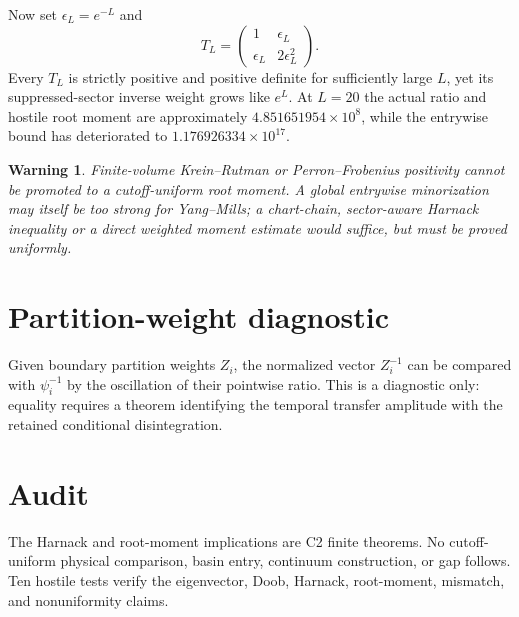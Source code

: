 \documentclass[11pt]{article}
\newtheorem{warning}{Warning}
\begin{document}
Now set $\epsilon_L=e^{-L}$ and
\[
 T_L=\begin{pmatrix}1&\epsilon_L\\
 \epsilon_L&2\epsilon_L^2\end{pmatrix}.
\]
Every $T_L$ is strictly positive and positive definite for sufficiently large
$L$, yet its suppressed-sector inverse weight grows like $e^L$.  At $L=20$
the actual ratio and hostile root moment are approximately
$4.851651954\times10^8$, while the entrywise bound has deteriorated to
$1.176926334\times10^{17}$.

\begin{warning}
Finite-volume Krein--Rutman or Perron--Frobenius positivity cannot be promoted
to a cutoff-uniform root moment.  A global entrywise minorization may itself be
too strong for Yang--Mills; a chart-chain, sector-aware Harnack inequality or a
direct weighted moment estimate would suffice, but must be proved uniformly.
\end{warning}

\section{Partition-weight diagnostic}
Given boundary partition weights $Z_i$, the normalized vector $Z_i^{-1}$ can
be compared with $\psi_i^{-1}$ by the oscillation of their pointwise ratio.
This is a diagnostic only: equality requires a theorem identifying the
temporal transfer amplitude with the retained conditional disintegration.

\section{Audit}
The Harnack and root-moment implications are C2 finite theorems.  No
cutoff-uniform physical comparison, basin entry, continuum construction, or
gap follows.  Ten hostile tests verify the eigenvector, Doob, Harnack,
root-moment, mismatch, and nonuniformity claims.
\end{document}
